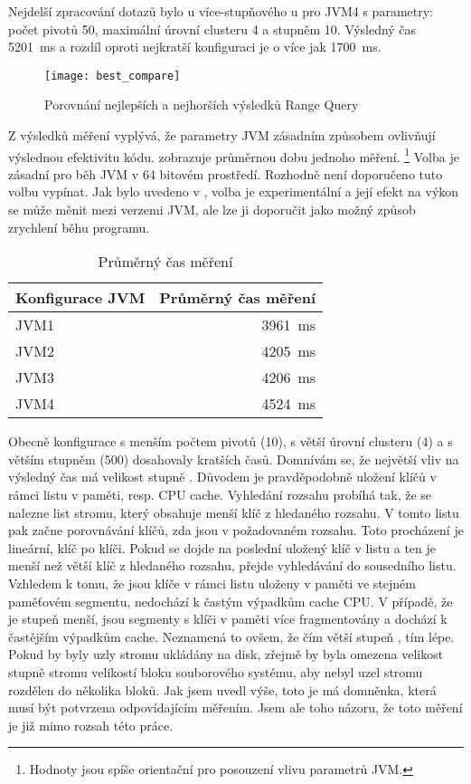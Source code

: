 Nejdelší zpracování dotazů bylo u více-stupňového \MIndex u pro JVM4 s parametry: počet pivotů 50, maximální úrovní clusteru 4 a stupněm \BPTree{} 10.
Výsledný čas \SI{5201}{\ms} a rozdíl oproti nejkratší konfiguraci je o více jak \SI{1700}{\ms}.

\begin{figure}[h]
\centering
\texttt{[image: best\_compare]}
\caption{Porovnání nejlepších a nejhorších výsledků Range Query\label{fig:jvm1p50}}
\end{figure}

Z výsledků měření vyplývá, že parametry JVM zásadním způsobem ovlivňují výslednou efektivitu kódu.
 zobrazuje průměrnou dobu jednoho měření.
\footnote{Hodnoty jsou spíše orientační pro posouzení vlivu parametrů JVM.}
Volba  je zásadní pro běh JVM v 64 bitovém prostředí.
Rozhodně není doporučeno tuto volbu vypínat.
Jak bylo uvedeno v , volba  je experimentální a její efekt na výkon se může měnit mezi verzemi JVM, ale lze ji doporučit jako možný způsob zrychlení běhu programu.

\begin{table}[h]
\center
\begin{tabular}{| l  | r |}
\hline
Konfigurace JVM & Průměrný čas měření \\ \hline
\hline
JVM1 & \SI{3961}{\ms} \\ \hline
JVM2 & \SI{4205}{\ms} \\ \hline
JVM3 & \SI{4206}{\ms} \\ \hline
JVM4 & \SI{4524}{\ms} \\ \hline
\end{tabular}
\caption{Průměrný čas měření\label{tab:jvmavgtime}}
\end{table}

Obecně konfigurace s menším počtem pivotů (10), s větší úrovní clusteru (4) a s větším stupněm \BPTree{} (500) dosahovaly kratších časů.
Domnívám se, že největší vliv na výsledný čas má velikost stupně \BPTree.
Důvodem je pravděpodobně uložení klíčů v rámci listu v paměti, resp. CPU cache.
Vyhledání rozsahu probíhá tak, že se nalezne list stromu, který obsahuje menší klíč z hledaného rozsahu.
V tomto listu pak začne porovnávání klíčů, zda jsou v požadovaném rozsahu.
Toto procházení je lineární, klíč po klíči.
Pokud se dojde na poslední uložený klíč v listu a ten je menší než větší klíč z hledaného rozsahu, přejde vyhledávání do sousedního listu.
Vzhledem k tomu, že jsou klíče v rámci listu uloženy v paměti ve stejném paměťovém segmentu, nedochází k častým výpadkům cache CPU.
V případě, že je stupeň \BPTree{} menší, jsou segmenty s klíči v paměti více fragmentovány a dochází k častějším výpadkům cache.
Neznamená to ovšem, že čím větší stupeň \BPTree{}, tím lépe. 
Pokud by byly uzly stromu ukládány na disk, zřejmě by byla omezena velikost stupně stromu velikostí bloku souborového systému, aby nebyl uzel stromu rozdělen do několika bloků.
Jak jsem uvedl výše, toto je má domněnka, která musí být potvrzena odpovídajícím měřením.
Jsem ale toho názoru, že toto měření je již mimo rozsah této práce.

